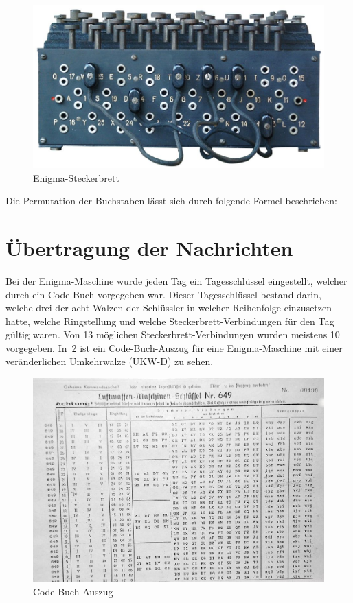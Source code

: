 \begin{figure}[htbp]
	\centering
	\includegraphics[width=.4\linewidth]{Enigma/enigma-steckerbrett}
	\caption{Enigma-Steckerbrett\autocite{wiki:enigmasteckerbrett}}
	\label{fig:enigma_plugboard}
\end{figure}

Die Permutation der Buchstaben lässt sich durch folgende Formel beschrieben:

\section{Übertragung der Nachrichten}\label{sec:uebertragung-der-nachrichten}
Bei der Enigma-Maschine wurde jeden Tag ein Tagesschlüssel eingestellt, welcher durch ein Code-Buch vorgegeben war.
Dieser Tagesschlüssel bestand darin, welche drei der acht Walzen der Schlüssler in welcher Reihenfolge einzusetzen hatte, welche Ringstellung und welche Steckerbrett-Verbindungen für den Tag gültig waren.
Von 13 möglichen Steckerbrett-Verbindungen wurden meistens 10 vorgegeben.
In~\cref{fig:enigma_code_book} ist ein Code-Buch-Auszug für eine Enigma-Maschine mit einer veränderlichen Umkehrwalze (UKW-D) zu sehen.

\begin{figure}[htbp]
	\centering
	\includegraphics[width=.6\linewidth]{Enigma/Enigma-code-book}
	\caption{Code-Buch-Auszug\autocite{wiki:enigmacodebook}}
	\label{fig:enigma_code_book}
\end{figure}


